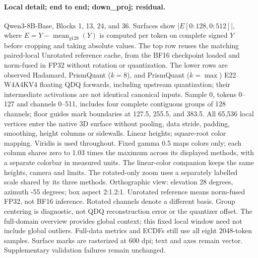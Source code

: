 \paragraph{Local detail; end to end; down\_proj; residual.} Qwen3-8B-Base, Blocks 1, 13, 24, and 36. Surfaces show $|E[0:128,0:512]|$, where $E=Y-\operatorname{mean}_{g128}(Y)$ is computed per token on complete signed $Y$ before cropping and taking absolute values. The top row reuses the matching paired-local Unrotated reference cache, from the BF16 checkpoint loaded and norm-fused in FP32 without rotation or quantization. The lower rows are observed Hadamard, PrismQuant ($k=8$), and PrismQuant ($k=\max$) E22 W4A4KV4 floating QDQ forwards, including upstream quantization; their intermediate activations are not identical canonical inputs. Sample 0, tokens 0--127 and channels 0--511, includes four complete contiguous groups of 128 channels; floor guides mark boundaries at 127.5, 255.5, and 383.5. All 65,536 local vertices enter the native 3D surface without pooling, data stride, padding, smoothing, height columns or sidewalls. Linear heights; square-root color mapping. Viridis is used throughout. Fixed gamma 0.5 maps colors only; each column shares zero to 1.03 times the maximum across its displayed methods, with a separate colorbar in measured units. The linear-color companion keeps the same heights, camera and limits. The rotated-only zoom uses a separately labelled scale shared by its three methods. Orthographic view: elevation 28 degrees, azimuth -55 degrees; box aspect 2:1.2:1. Unrotated reference means norm-fused FP32, not BF16 inference. Rotated channels denote a different basis. Group centering is diagnostic, not QDQ reconstruction error or the quantizer offset. The full-domain overview provides global context; this fixed local window need not include global outliers. Full-data metrics and ECDFs still use all eight 2048-token samples. Surface marks are rasterized at 600 dpi; text and axes remain vector. Supplementary validation failures remain unchanged.

